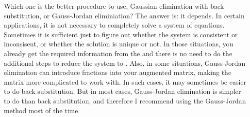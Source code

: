 Which one is the better procedure to use, Gaussian elimination with
back substitution, or Gauss-Jordan eliminiation? The answer is: it
depends. In certain applications, it is not necessary to completely
solve a system of equations. Sometimes it is sufficient just to figure
out whether the system is consistent or inconsisent, or whether the
solution is unique or not. In those situations, you already get the
required information from the {\ef} and there is no need to do the
additional steps to reduce the system to {\rref}. Also, in some
situations, Gauss-Jordan elimination can introduce fractions into your
augmented matrix, making the matrix more complicated to work with. In
such cases, it may sometimes be easier to do back substitution. But in
most cases, Gauss-Jordan elimination is simpler to do than back
substitution, and therefore I recommend using the Gauss-Jordan method
most of the time. 
